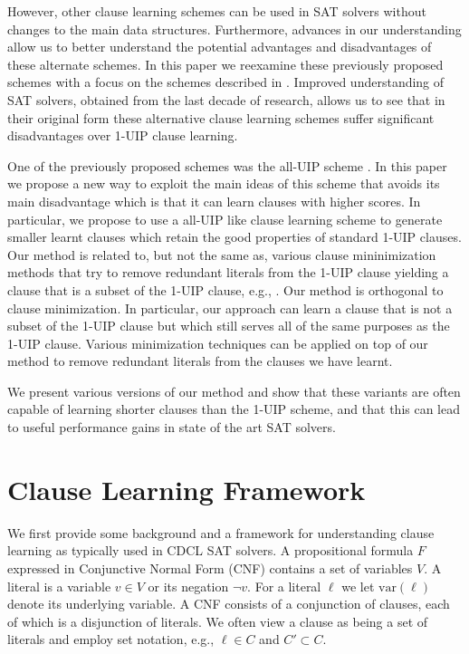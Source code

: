 \documentclass[runningheads]{llncs}
\newcommand{\sat}{SAT\xspace}
\newcommand{\oneuip}{1-UIP\xspace}
\newcommand{\alluip}{all-UIP\xspace}
\newcommand{\LBD}{\text{LBD}\xspace}
\newcommand{\var}{\text{var}}
\begin{document}
However, other clause learning schemes can be used in SAT solvers
without changes to the main data structures. Furthermore, advances in
our understanding allow us to better understand the potential
advantages and disadvantages of these alternate schemes. In this paper
we reexamine these previously proposed schemes with a focus on the
schemes described in \cite{DBLP:conf/iccad/ZhangMMM01}. Improved
understanding of \sat solvers, obtained from the last decade of
research, allows us to see that in their original form these
alternative clause learning schemes suffer significant disadvantages
over \oneuip clause learning.

One of the previously proposed schemes was the \alluip scheme
\cite{DBLP:conf/iccad/ZhangMMM01}. In this paper we propose a new way
to exploit the main ideas of this scheme that avoids its main
disadvantage which is that it can learn clauses with higher \LBD
scores. In particular, we propose to use a \alluip like clause
learning scheme to generate smaller learnt clauses which retain the
good properties of standard \oneuip clauses. Our method is related to,
but not the same as, various clause mininimization methods that try to
remove redundant literals from the \oneuip clause yielding a clause that
is a subset of the \oneuip clause, e.g.,
\cite{DBLP:conf/sat/SorenssonB09,DBLP:conf/ijcai/LuoLXML17,DBLP:conf/sat/WieringaH13}.
Our method is orthogonal to clause minimization. In particular, our
approach can learn a clause that is not a subset of the \oneuip clause
but which still serves all of the same purposes as the \oneuip clause.
Various minimization techniques can be applied on top of our method to
remove redundant literals from the clauses we have learnt.

We present various versions of our method and show that these variants
are often capable of learning shorter clauses than the \oneuip scheme,
and that this can lead to useful performance gains in state of the art
\sat solvers.

\section{Clause Learning Framework}
We first provide some background and a framework for understanding
clause learning as typically used in CDCL \sat solvers. A
propositional formula $F$ expressed in Conjunctive Normal Form (CNF)
contains a set of variables $V$. A literal is a variable $v\in V$ or
its negation $\lnot v$. For a literal $\ell$ we let $\var(\ell)$
denote its underlying variable. A CNF consists of a conjunction of
clauses, each of which is a disjunction of literals. We often view a
clause as being a set of literals and employ set notation, e.g.,
$\ell\in C$ and $C'\subset C$. 
\end{document}

